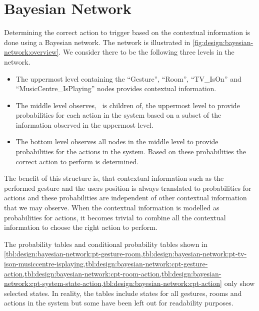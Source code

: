 \section{Bayesian Network}
\label{sec:design:bayesian-network}

Determining the correct action to trigger based on the contextual information is done using a Bayesian network. The network is illustrated in \cref{fig:design:bayesian-network:overview}. We consider there to be the following three levels in the network.

\begin{itemize}
\item The uppermost level containing the ``Gesture'', ``Room'', ``TV\_IsOn'' and ``MusicCentre\_IsPlaying'' nodes provides contextual information.
\item The middle level observes, \ie~is children of, the uppermost level to provide probabilities for each action in the system based on a subset of the information observed in the uppermost level.
\item The bottom level observes all nodes in the middle level to provide probabilities for the actions in the system. Based on these probabilities the correct action to perform is determined.
\end{itemize}

The benefit of this structure is, that contextual information such as the performed gesture and the users position is always translated to probabilities for actions and these probabilities are independent of other contextual information that we may observe. When the contextual information is modelled as probabilities for actions, it becomes trivial to combine all the contextual information to choose the right action to perform.

The probability tables and conditional probability tables shown in \cref{tbl:design:bayesian-network:pt-gesture-room,tbl:design:bayesian-network:pt-tv-ison-musiccentre-isplaying,tbl:design:bayesian-network:cpt-gesture-action,tbl:design:bayesian-network:cpt-room-action,tbl:design:bayesian-network:cpt-system-state-action,tbl:design:bayesian-network:cpt-action} only show selected states. In reality, the tables include states for all gestures, rooms and actions in the system but some have been left out for readability purposes.

